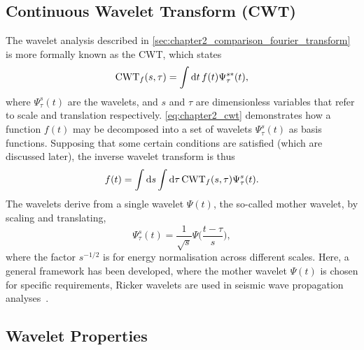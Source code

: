 

\subsection{Continuous Wavelet Transform (CWT)}\label{sec:chapter2_continuous_wavelet_transform}

The wavelet analysis described in \cref{sec:chapter2_comparison_fourier_transform} is more formally known as the CWT, which states
%
\begin{equation}\label{eq:chapter2_cwt}
	\text{CWT}_{f}(s,\tau)
	= \int\dd{t} f(t) \Psi^{s\ast}_{\tau}(t),
\end{equation}
%
where \(\Psi^{s}_{\tau}(t)\) are the wavelets, and \(s\) and \(\tau{}\) are dimensionless variables that refer to scale and translation respectively.
\cref{eq:chapter2_cwt} demonstrates how a function \(f(t)\) may be decomposed into a set of wavelets \(\Psi^{s}_{\tau}(t)\) as basis functions.
Supposing that some certain conditions are satisfied (which are discussed later), the inverse wavelet transform is thus
%
\begin{equation}
	f(t)
	= \int\dd{s} \int\dd{\tau} \text{CWT}_{f}(s,\tau) \Psi^{s}_{\tau}(t).
\end{equation}
%
The wavelets derive from a single wavelet \(\Psi(t)\), the so-called mother wavelet, by scaling and translating, \ie{}
%
\begin{equation}\label{eq:chapter2_mother_wavelet}
	\Psi^{s}_{\tau}(t)
	= \frac{1}{\sqrt{s}} \Psi\bigg(\frac{t-\tau}{s}\bigg),
\end{equation}
%
where the factor \(s^{-1/2}\) is for energy normalisation across different scales.
Here, a general framework has been developed, where the mother wavelet \(\Psi(t)\) is chosen for specific requirements, \eg{} Ricker wavelets are used in seismic wave propagation analyses~\cite{Wang2014}.

\subsection{Wavelet Properties}

